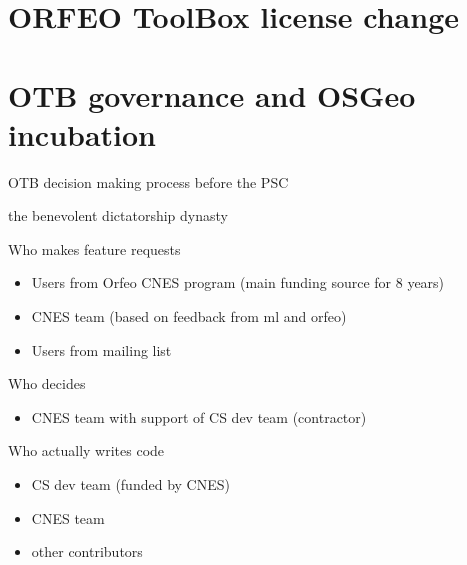 \documentclass[smaller]{beamer}
\begin{document}
\section{ORFEO ToolBox license change}

\section{OTB governance and OSGeo incubation}

\label{sec:orgheadline10}
\begin{frame}[label={sec:orgheadline7}]{OTB decision making process before the PSC}
\begin{block}{the benevolent dictatorship dynasty}
\end{block}
\begin{block}{Who makes feature requests}
\begin{itemize}
\item Users from Orfeo CNES program (main funding source for 8 years)
\item CNES team (based on feedback from ml and orfeo)
\item Users from mailing list
\end{itemize}
\end{block}
\begin{block}{Who decides}
\begin{itemize}
\item CNES team with support of CS dev team (contractor)
\end{itemize}
\end{block}
\begin{block}{Who actually writes code}
\begin{itemize}
\item CS dev team (funded by CNES)
\item CNES team
\item other contributors
\end{itemize}
\end{block}
\end{frame}
\end{document}
